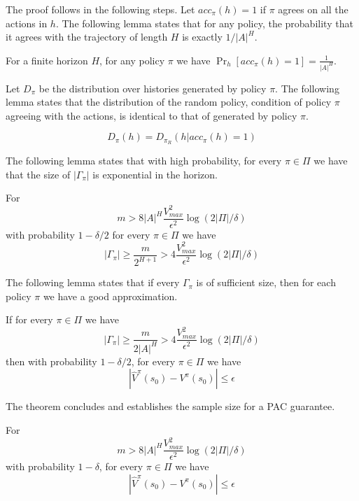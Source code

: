 The proof follows in the following steps. Let $acc_\pi(h)=1$ if
$\pi$ agrees on all the actions in $h$. The following lemma states
that for any policy, the probability that it agrees with the
trajectory of length $H$ is exactly $1/|A|^H$.
\begin{lemma}
For a finite horizon $H$, for any policy $\pi$ we have
$\Pr_h[acc_\pi(h)=1]=\frac{1}{|A|^H}$.
\end{lemma}

Let $D_\pi$ be the distribution over histories generated by policy
$\pi$. The following lemma states that the distribution of the
random policy, condition of policy $\pi$ agreeing with the actions,
is identical to that of generated by policy $\pi$.
\begin{lemma}
\[
D_\pi(h)=D_{\pi_R}(h|acc_\pi(h)=1)
\]
\end{lemma}

The following lemma states that with high probability, for every
$\pi\in \Pi$ we have that the size of $|\Gamma_\pi|$ is exponential
in the horizon.
\begin{lemma}
For
\[
m> 8|A|^{H}\frac{V^2_{max}}{\epsilon^2}\log(2|\Pi|/\delta)
\]
with probability $1-\delta/2$ for every $\pi\in \Pi$ we have
\[
|\Gamma_\pi|\geq \frac{m}{2^{H+1}}>
4\frac{V^2_{max}}{\epsilon^2}\log(2|\Pi|/\delta)
\]
\end{lemma}

The following lemma states that if every $\Gamma_\pi$ is of
sufficient size, then for each policy $\pi$ we have a good
approximation.
\begin{lemma}
If for every $\pi\in \Pi$ we have
\[
|\Gamma_\pi|\geq \frac{m}{2|A|^{H}}> 4
\frac{V^2_{max}}{\epsilon^2}\log(2|\Pi|/\delta)
\]
then with probability $1-\delta/2$, for every $\pi\in \Pi$ we have
\[
|\hat{V}^\pi (s_0)-V^\pi(s_0)|\leq \epsilon
\]
\end{lemma}


The theorem concludes and establishes the sample size for a PAC
guarantee.
\begin{theorem}
For
\[
m> 8|A|^{H}\frac{V^2_{max}}{\epsilon^2}\log(2|\Pi|/\delta)
\]
with probability $1-\delta$, for every $\pi\in \Pi$ we have
\[
|\hat{V}^\pi (s_0)-V^\pi(s_0)|\leq \epsilon
\]
\end{theorem}



















%
